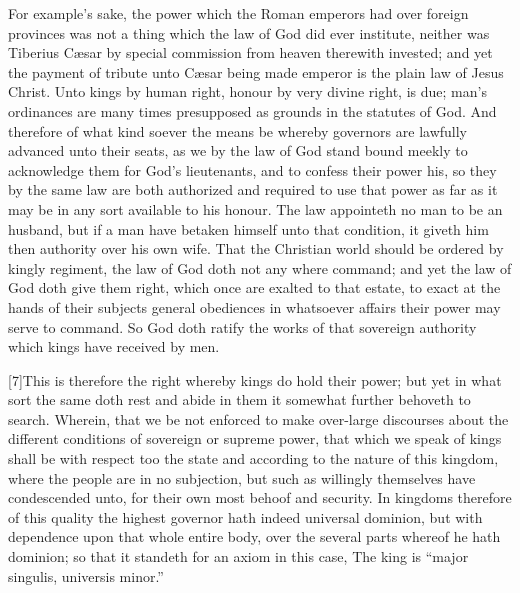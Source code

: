 For example’s sake, the power which the Roman emperors had over foreign provinces was not a thing which the law of God did ever institute, neither was Tiberius Cæsar by special commission from heaven therewith invested; and yet the payment of tribute unto Cæsar being made emperor is the plain law of Jesus Christ. Unto kings by human right, honour by very divine right, is due; man’s ordinances are  many times presupposed as grounds in the statutes of God. And therefore of what kind soever the means be whereby governors are lawfully advanced unto their seats, as we by the law of God stand bound meekly to acknowledge them for God’s lieutenants, and to confess their power his, so they by the same law are both authorized and required to use that power as far as it may be in any sort available to his honour. The law appointeth no man to be an husband, but if a man have betaken himself unto that condition, it giveth him then authority over his own wife. That the Christian world should be ordered by kingly regiment, the law of God doth not any where command; and yet the law of God doth give them right, which once are exalted to that estate, to exact at the hands of their subjects general obediences in whatsoever affairs their power may serve to command. So God doth ratify the works of that sovereign authority which kings have received by men.

[7]This is therefore the right whereby kings do hold their power; but yet in what sort the same doth rest and abide in them it somewhat further behoveth to search. Wherein, that we be not enforced to make over-large discourses about the different conditions of sovereign or supreme power, that which we speak of kings shall be with respect too the state and according to the nature of this kingdom, where the people are in no subjection, but such as willingly themselves have condescended unto, for their own most behoof and security. In kingdoms therefore of this quality the highest governor hath indeed universal dominion, but with dependence upon that whole entire body, over the several parts whereof he hath dominion; so that it standeth for an axiom in this case, The king is “major singulis, universis minor.”


